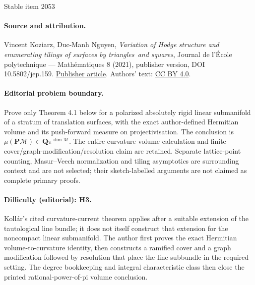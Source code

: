 \documentclass[11pt]{article}
\numberwithin{equation}{section}
\begin{document}
\begin{center}{\Large Stable item 2053}\end{center}
\paragraph{Source and attribution.}
Vincent Koziarz, Duc-Manh Nguyen, \emph{Variation of Hodge structure and enumerating tilings of surfaces by triangles and squares}, Journal de l’École polytechnique — Mathématiques 8 (2021), publisher version, DOI 10.5802/jep.159. \href{https://jep.centre-mersenne.org/articles/10.5802/jep.159/}{Publisher article}. Authors' text: \href{https://creativecommons.org/licenses/by/4.0/}{CC BY 4.0}.
\paragraph{Editorial problem boundary.}
Prove only Theorem 4.1 below for a polarized absolutely rigid linear submanifold of a stratum of translation surfaces, with the exact author-defined Hermitian volume and its push-forward measure on projectivisation. The conclusion is \(\mu(\mathbf P\mathcal M)\in\mathbf Q\pi^{\dim\mathcal M}\). The entire curvature-volume calculation and finite-cover/graph-modification/resolution claim are retained. Separate lattice-point counting, Masur--Veech normalization and tiling asymptotics are surrounding context and are not selected; their sketch-labelled arguments are not claimed as complete primary proofs.
\paragraph{Difficulty (editorial): H3.}
Kollár's cited curvature-current theorem applies after a suitable extension of the tautological line bundle; it does not itself construct that extension for the noncompact linear submanifold. The author first proves the exact Hermitian volume-to-curvature identity, then constructs a ramified cover and a graph modification followed by resolution that place the line subbundle in the required setting. The degree bookkeeping and integral characteristic class then close the printed rational-power-of-pi volume conclusion.
\end{document}
